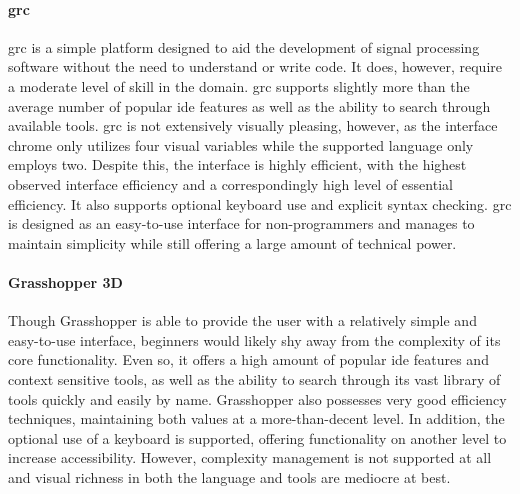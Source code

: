 \paragraph{\acl{grc}} \ac{grc} is a simple platform designed to aid the
development of signal processing software without the need to understand or
write code. It does, however, require a moderate level of skill in the
domain. \ac{grc} supports slightly more than the average number of popular
\ac{ide} features as well as the ability to search through available tools.
\ac{grc} is not extensively visually pleasing, however, as the interface
chrome only utilizes four visual variables while the supported language
only employs two. Despite this, the interface is highly efficient, with the
highest observed interface efficiency and a correspondingly high level of
essential efficiency. It also supports optional keyboard use and
explicit syntax checking. \ac{grc} is designed as an easy-to-use interface
for non-programmers and manages to maintain simplicity while still offering a
large amount of technical power.

\paragraph{Grasshopper 3D} Though Grasshopper is able to provide the user
with a relatively simple and easy-to-use interface, beginners would likely
shy away from the complexity of its core functionality. Even so, it offers
a high amount of popular \ac{ide} features and context sensitive tools, as
well as the ability to search through its vast library of tools quickly and
easily by name. Grasshopper also possesses very good efficiency techniques,
maintaining both values at a more-than-decent level. In addition, the
optional use of a keyboard is supported, offering functionality on another
level to increase accessibility. However, complexity management is not supported at
all and visual richness in both the language and tools are
mediocre at best.

